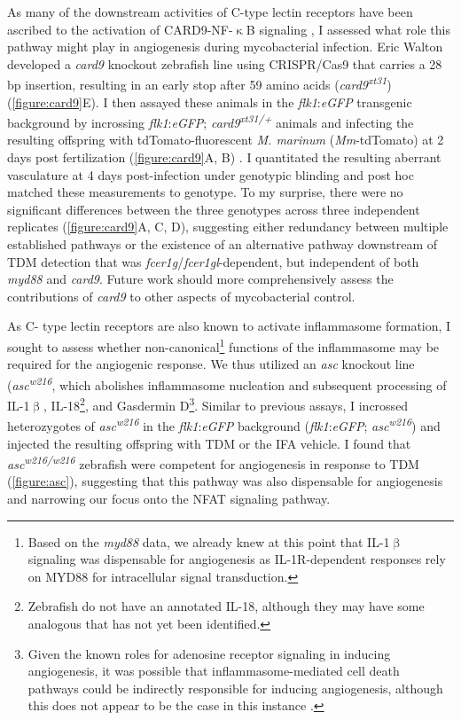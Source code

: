 As many of the downstream activities of C\hyp{}type lectin receptors have been ascribed to the activation of CARD9\hyp{}NF\hyp{}$\upkappa$B signaling \citep{Goodridge2009, LobatoPascual2013, Zhao2014, Williams2017, Deerhake2021}, I assessed what role this pathway might play in angiogenesis during mycobacterial infection. Eric Walton developed a \textit{card9} knockout zebrafish line using CRISPR/Cas9 that carries a 28 bp insertion, resulting in an early stop after 59 amino acids (\textit{card9\textsuperscript{xt31}}) (\autoref{figure:card9}E). I then assayed these animals in the \textit{flk1}:\textit{eGFP} transgenic background by incrossing \textit{flk1}:\textit{eGFP}; \textit{card9\textsuperscript{xt31/+}} animals and infecting the resulting offspring with tdTomato\hyp{}fluorescent \textit{M. marinum} (\textit{Mm}\hyp{}tdTomato) at 2 days post fertilization (\autoref{figure:card9}A, B) \citep{Jin2005, Oehlers2015}. I quantitated the resulting aberrant vasculature at 4 days post\hyp{}infection under genotypic blinding and post hoc matched these measurements to genotype. To my surprise, there were no significant differences between the three genotypes across three independent replicates (\autoref{figure:card9}A, C, D), suggesting either redundancy between multiple established pathways or the existence of an alternative pathway downstream of TDM detection that was \textit{fcer1g}/\textit{fcer1gl}\hyp{}dependent, but independent of both \textit{myd88} and \textit{card9}. Future work should more comprehensively assess the contributions of \textit{card9} to other aspects of mycobacterial control.

As C\hyp{} type lectin receptors are also known to activate inflammasome formation, I sought to assess whether non\hyp{}canonical\footnote{Based on the \textit{myd88} data, we already knew at this point that IL\hyp{}1$\upbeta$ signaling was dispensable for angiogenesis as IL\hyp{}1R\hyp{}dependent responses rely on MYD88 for intracellular signal transduction.} functions of the inflammasome may be required for the angiogenic response. We thus utilized an \textit{asc} knockout line (\textit{asc\textsuperscript{w216}}, which abolishes inflammasome nucleation and subsequent processing of IL\hyp{}1$\upbeta$, IL\hyp{}18\footnote{Zebrafish do not have an annotated IL\hyp{}18, although they may have some analogous that has not yet been identified.}, and Gasdermin D\footnote{Given the known roles for adenosine receptor signaling in inducing angiogenesis, it was possible that inflammasome\hyp{}mediated cell death pathways could be indirectly responsible for inducing angiogenesis, although this does not appear to be the case in this instance \citep{Clark2007, Montesinos2002, Dusseau1986, Auchampach2007}.}. Similar to previous assays, I incrossed heterozygotes of \textit{asc\textsuperscript{w216}} in the \textit{flk1}:\textit{eGFP} background (\textit{flk1}:\textit{eGFP}; \textit{asc\textsuperscript{w216}}) and injected the resulting offspring with TDM or the IFA vehicle. I found that \textit{asc\textsuperscript{w216/w216}} zebrafish were competent for angiogenesis in response to TDM (\autoref{figure:asc}), suggesting that this pathway was also dispensable for angiogenesis and narrowing our focus onto the NFAT signaling pathway.


